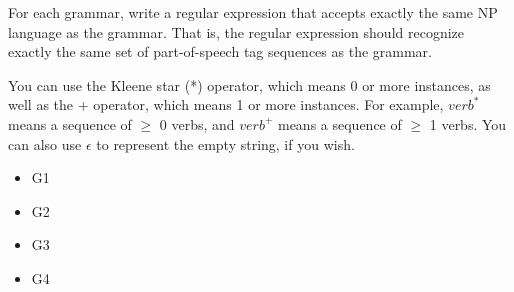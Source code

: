 \documentclass[11pt]{article}
\begin{document}
\begin{enumerate}
\vspace*{.2in}
For each grammar, write a regular expression that accepts
exactly the same NP language as the grammar. That is, the regular
expression should recognize exactly the same set of part-of-speech tag
sequences as the grammar.

You can use the Kleene star (*) operator, which means 0 or more
instances, as well as the + operator, which means 1 or more
instances. For example, $verb^{*}$ means a sequence of $\geq$ 0 verbs,
and $verb^{+}$ means a sequence of $\geq$ 1 verbs. You can also use
$\epsilon$ to represent the empty string, if you wish. 

\begin{itemize}

\item G1
\vspace*{.2in}

\item G2
\vspace*{.2in}

\item G3
\vspace*{.2in}

\item G4
\vspace*{.2in}

\end{itemize}



\end{enumerate}
\end{document}
